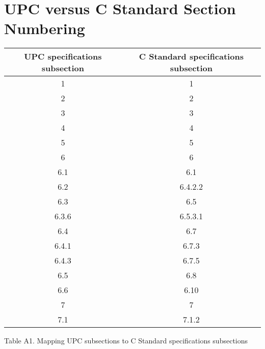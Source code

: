 \pagebreak
\section{UPC versus C Standard Section Numbering}

\begin{center}
\begin{tabular}{|c|c|}
\hline
UPC specifications subsection &   C Standard specifications subsection \\
\hline
1   &   1 \\
2   &   2 \\
3   &   3 \\
4   &   4 \\
5   &   5 \\
6   &  6 \\
6.1 &   6.1 \\
6.2 &   6.4.2.2 \\
6.3 &   6.5 \\
6.3.6 & 6.5.3.1 \\
6.4 &   6.7 \\
6.4.1 & 6.7.3 \\
6.4.3 & 6.7.5 \\
6.5 &   6.8 \\
6.6 &   6.10 \\
7   &   7 \\
7.1 &   7.1.2 \\
\hline
\end{tabular}                                                  

Table A1. Mapping UPC subsections to C Standard specifications subsections  
\end{center}

